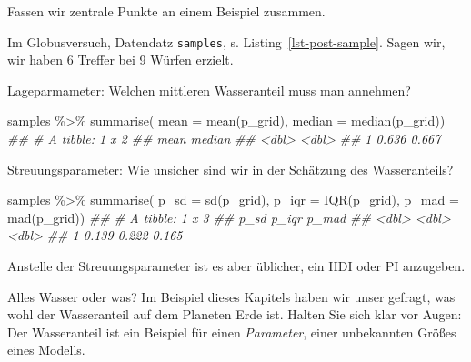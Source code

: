 \documentclass[
  a4paper,
  DIV=11]{scrreprt}
\newenvironment{Shaded}{\begin{snugshade}}{\end{snugshade}}
\newcommand{\AttributeTok}[1]{\textcolor[rgb]{0.40,0.45,0.13}{#1}}
\newcommand{\DocumentationTok}[1]{\textcolor[rgb]{0.37,0.37,0.37}{\textit{#1}}}
\newcommand{\FunctionTok}[1]{\textcolor[rgb]{0.28,0.35,0.67}{#1}}
\newcommand{\NormalTok}[1]{\textcolor[rgb]{0.00,0.23,0.31}{#1}}
\newcommand{\SpecialCharTok}[1]{\textcolor[rgb]{0.37,0.37,0.37}{#1}}
\theoremstyle{definition}
\theoremstyle{remark}
\begin{document}
Fassen wir zentrale Punkte an einem Beispiel zusammen.

Im Globusversuch, Datendatz \texttt{samples}, s.
Listing~\ref{lst-post-sample}. Sagen wir, wir haben 6 Treffer bei 9
Würfen erzielt.

Lageparmameter: Welchen mittleren Wasseranteil muss man annehmen?

\begin{Shaded}
\begin{Highlighting}[]
\NormalTok{samples }\SpecialCharTok{\%\textgreater{}\%} 
  \FunctionTok{summarise}\NormalTok{(}
    \AttributeTok{mean   =} \FunctionTok{mean}\NormalTok{(p\_grid),}
    \AttributeTok{median =} \FunctionTok{median}\NormalTok{(p\_grid))  }
\DocumentationTok{\#\# \# A tibble: 1 x 2}
\DocumentationTok{\#\#    mean median}
\DocumentationTok{\#\#   \textless{}dbl\textgreater{}  \textless{}dbl\textgreater{}}
\DocumentationTok{\#\# 1 0.636  0.667}
\end{Highlighting}
\end{Shaded}

Streuungsparameter: Wie unsicher sind wir in der Schätzung des
Wasseranteils?

\begin{Shaded}
\begin{Highlighting}[]
\NormalTok{samples }\SpecialCharTok{\%\textgreater{}\%} 
  \FunctionTok{summarise}\NormalTok{(}
    \AttributeTok{p\_sd   =} \FunctionTok{sd}\NormalTok{(p\_grid),}
    \AttributeTok{p\_iqr =} \FunctionTok{IQR}\NormalTok{(p\_grid),}
    \AttributeTok{p\_mad =} \FunctionTok{mad}\NormalTok{(p\_grid))  }
\DocumentationTok{\#\# \# A tibble: 1 x 3}
\DocumentationTok{\#\#    p\_sd p\_iqr p\_mad}
\DocumentationTok{\#\#   \textless{}dbl\textgreater{} \textless{}dbl\textgreater{} \textless{}dbl\textgreater{}}
\DocumentationTok{\#\# 1 0.139 0.222 0.165}
\end{Highlighting}
\end{Shaded}

Anstelle der Streuungsparameter ist es aber üblicher, ein HDI oder PI
anzugeben.

\begin{tcolorbox}[enhanced jigsaw, left=2mm, colframe=quarto-callout-important-color-frame, opacityback=0, arc=.35mm, rightrule=.15mm, breakable, toptitle=1mm, colbacktitle=quarto-callout-important-color!10!white, colback=white, coltitle=black, bottomrule=.15mm, titlerule=0mm, opacitybacktitle=0.6, bottomtitle=1mm, title=\textcolor{quarto-callout-important-color}{\faExclamation}\hspace{0.5em}{Wichtig}, toprule=.15mm, leftrule=.75mm]
Alles Wasser oder was? Im Beispiel dieses Kapitels haben wir unser
gefragt, was wohl der Wasseranteil auf dem Planeten Erde ist. Halten Sie
sich klar vor Augen: Der Wasseranteil ist ein Beispiel für einen
\emph{Parameter}, einer unbekannten Größes eines Modells.
\end{tcolorbox}
\end{document}
